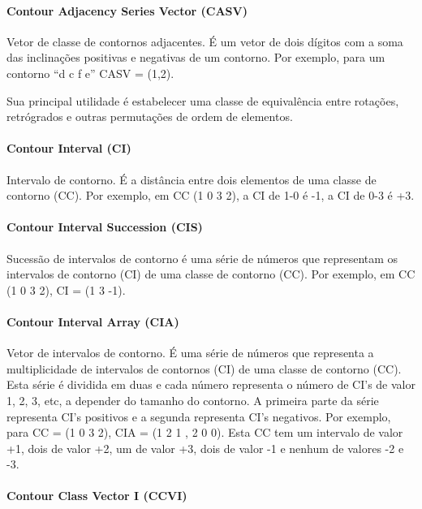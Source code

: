 \documentclass{article}
\begin{document}
\paragraph{Contour Adjacency Series Vector (CASV)}
\label{sec:cont-adjac-seri-1}

Vetor de classe de contornos adjacentes. É um vetor de dois dígitos
com a soma das inclinações positivas e negativas de um contorno. Por
exemplo, para um contorno ``d c f e'' CASV = (1,2).

Sua principal utilidade é estabelecer uma classe de equivalência entre
rotações, retrógrados e outras permutações de ordem de elementos.

\paragraph{Contour Interval (CI)}
\label{sec:contour-interval-ci}

Intervalo de contorno. É a distância entre dois elementos de uma
classe de contorno (CC). Por exemplo, em CC (1 0 3 2), a CI de 1-0 é
-1, a CI de 0-3 é +3.

\paragraph{Contour Interval Succession (CIS)}
\label{sec:cont-interv-succ}

Sucessão de intervalos de contorno é uma série de números que
representam os intervalos de contorno (CI) de uma classe de contorno
(CC). Por exemplo, em CC (1 0 3 2), CI = (1 3 -1).

\paragraph{Contour Interval Array (CIA)}
\label{sec:cont-interv-array}

Vetor de intervalos de contorno. É uma série de números que representa
a multiplicidade de intervalos de contornos (CI) de uma classe de
contorno (CC). Esta série é dividida em duas e cada número representa
o número de CI's de valor 1, 2, 3, etc, a depender do tamanho do
contorno. A primeira parte da série representa CI's positivos e a
segunda representa CI's negativos. Por exemplo, para CC = (1 0 3 2),
CIA = (1 2 1 , 2 0 0). Esta CC tem um intervalo de valor +1, dois de
valor +2, um de valor +3, dois de valor -1 e nenhum de valores -2 e
-3.

\paragraph{Contour Class Vector I (CCVI)}
\label{sec:contour-class-vector-1}
\end{document}
